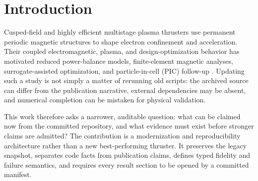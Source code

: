 \documentclass[11pt]{article}
\begin{document}
\section{Introduction}

Cusped-field and highly efficient multistage plasma thrusters use permanent
periodic magnetic structures to shape electron confinement and acceleration.
Their coupled electromagnetic, plasma, and design-optimization behavior has
motivated reduced power-balance models, finite-element magnetic analyses,
surrogate-assisted optimization, and particle-in-cell (PIC) follow-up
\cite{Kornfeld2007,Muffatti2017,Fahey2017,Yeo2020}. Updating such a study is
not simply a matter of rerunning old scripts: the archived source can differ
from the publication narrative, external dependencies may be absent, and
numerical completion can be mistaken for physical validation.

This work therefore asks a narrower, auditable question: what can be claimed
now from the committed repository, and what evidence must exist before stronger
claims are admitted? The contribution is a modernization and reproducibility
architecture rather than a new best-performing thruster. It preserves the
legacy snapshot, separates code facts from publication claims, defines typed
fidelity and failure semantics, and requires every result section to be opened
by a committed manifest.
\end{document}
